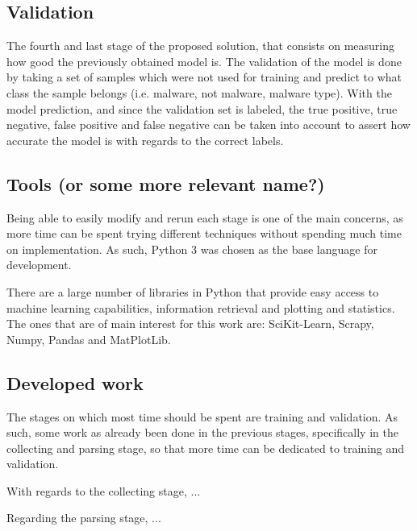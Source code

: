 \documentclass{llncs}
\begin{document}

\subsection{Validation}
The fourth and last stage of the proposed solution, that consists on measuring how good the previously obtained model is. The validation of the model is done by taking a set of samples which were not used for training and predict to what class the sample belongs (i.e. malware, not malware, malware type). With the model prediction, and since the validation set is labeled, the true positive, true negative, false positive and false negative can be taken into account to assert how accurate the model is with regards to the correct labels.


\subsection{Tools (or some more relevant name?)}
Being able to easily modify and rerun each stage is one of the main concerns, as more time can be spent trying different techniques without spending much time on implementation. As such, Python 3 was chosen as the base language for development.

There are a large number of libraries in Python that provide easy access to machine learning capabilities, information retrieval and plotting and statistics. The ones that are of main interest for this work are: SciKit-Learn, Scrapy, Numpy, Pandas and MatPlotLib.


\subsection{Developed work}
The stages on which most time should be spent are training and validation. As such, some work as already been done in the previous stages, specifically in the collecting and parsing stage, so that more time can be dedicated to training and validation.

With regards to the collecting stage, ...

Regarding the parsing stage, ...
\end{document}
